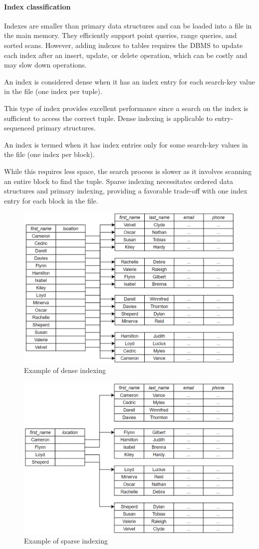 \paragraph*{Index classification}
Indexes are smaller than primary data structures and can be loaded into a file in the main memory.
They efficiently support point queries, range queries, and sorted scans. 
However, adding indexes to tables requires the DBMS to update each index after an insert, update, or delete operation, which can be costly and may slow down operations.

\begin{definition}
    An index is considered dense when it has an index entry for each search-key value in the file (one index per tuple). 
\end{definition}
This type of index provides excellent performance since a search on the index is sufficient to access the correct tuple. 
Dense indexing is applicable to entry-sequenced primary structures.
\begin{definition}
    An index is termed when it has index entries only for some search-key values in the file (one index per block). 
\end{definition}
While this requires less space, the search process is slower as it involves scanning an entire block to find the tuple. 
Sparse indexing necessitates ordered data structures and primary indexing, providing a favorable trade-off with one index entry for each block in the file.
\begin{figure}[H]
    \centering
    \includegraphics[width=0.5\linewidth]{images/dense.png}
    \caption{Example of dense indexing}
\end{figure} 
\begin{figure}[H]
    \centering
    \includegraphics[width=0.5\linewidth]{images/sparse.png}
    \caption{Example of sparse indexing}
\end{figure} 

